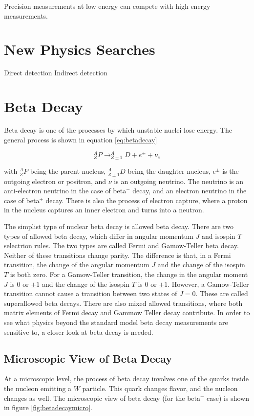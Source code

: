 \documentclass[main.tex]{subfiles}
\begin{document}
Precision measurements at low energy can compete with high energy measurements.

\section{New Physics Searches}
Direct detection
Indirect detection

\section{Beta Decay}
Beta decay is one of the processes by which unstable nuclei lose energy.
The general process is shown in equation \ref{eq:betadecay}

\begin{equation}
	\label{eq:betadecay}
	^{A}_{Z}P \rightarrow ^{A}_{Z\pm 1}D + e^{\pm} + \nu_{e}
\end{equation}

with $^{A}_{Z}P$ being the parent nucleus, $^{A}_{Z \pm 1}D$ being the daughter nucleus, $e^{\pm}$ is the outgoing electron or positron, and $\nu$ is an outgoing neutrino.
The neutrino is an anti-electron neutrino in the case of beta$^{-}$ decay, and an electron neutrino in the case of beta$^{+}$ decay. 
There is also the process of electron capture, where a proton in the nucleus captures an inner electron and turns into a neutron.

The simplist type of nuclear beta decay is allowed beta decay.
There are two types of allowed beta decay, which differ in angular momentum $J$ and isospin $T$ selectrion rules.
The two types are called Fermi and Gamow-Teller beta decay. 
Neither of these transitions change parity.
The difference is that, in a Fermi transition, the change of the angular momentum $J$ and the change of the isospin $T$ is both zero.
For a Gamow-Teller transition, the change in the angular moment $J$ is $0$ or $\pm1$ and the change of the isospin $T$ is $0$ or $\pm 1$.
However, a Gamow-Teller transition cannot cause a transition between two states of $J = 0$. 
These are called superallowed beta decays.
There are also mixed allowed transitions, where both matrix elements of Fermi decay and Gammow Teller decay contribute.
In order to see what physics beyond the standard model beta decay measurements are sensitive to, a closer look at beta decay is needed.

\subsection{Microscopic View of Beta Decay}
At a microscopic level, the process of beta decay involves one of the quarks inside the nucleon emitting a $W$ particle.
This quark changes flavor, and the nucleon changes as well. 
The microscopic view of beta decay (for the beta$^{-}$ case) is shown in figure \ref{fig:betadecaymicro}.
\end{document}
